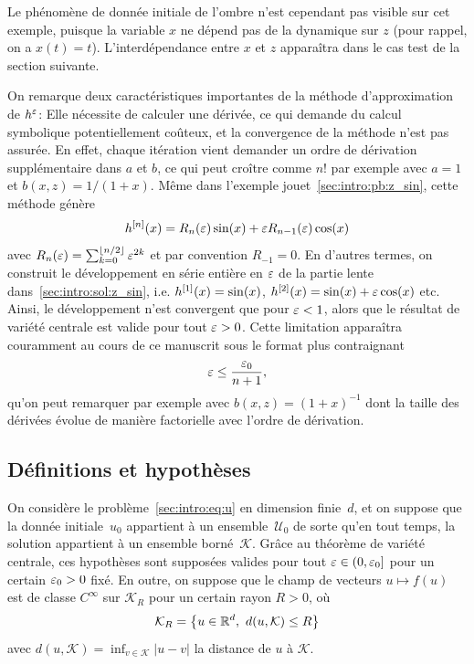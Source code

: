 \begin{FRremark*}
    Le phénomène de donnée initiale de l'ombre n'est cependant pas visible sur cet exemple, puisque la variable $x$ ne dépend pas de la dynamique sur $z$ (pour rappel, on a $x(t) = t$). L'interdépendance entre $x$ et $z$ apparaîtra dans le cas test de la section suivante.
\end{FRremark*}

On remarque deux caractéristiques importantes de la méthode d'approximation de $h^{\varepsilon}$: Elle nécessite de calculer une dérivée, ce qui demande du calcul symbolique potentiellement coûteux, et la convergence de la méthode n'est pas assurée. En effet, chaque itération vient demander un ordre de dérivation supplémentaire dans $a$ et $b$, ce qui peut croître comme $n!$ par exemple avec $a = 1$ et $b(x,z) = 1/(1+x)$. Même dans l'exemple jouet~\eqref{sec:intro:pb:z_sin}, cette méthode génère
\begin{equation*}
    h^{[n]}(x) = R_n(\varepsilon) \sin(x) + \varepsilon R_{n-1}(\varepsilon) \cos(x) 
\end{equation*}
avec $R_n(\varepsilon) = \sum_{k = 0}^{\left\lfloor n/2 \right\rfloor} \varepsilon^{2k}$ et par convention $R_{-1} = 0$. En d'autres termes, on construit le développement en série entière en $\varepsilon$ de la partie lente dans~\eqref{sec:intro:sol:z_sin}, i.e. $h^{[1]}(x) = \sin(x)$, $h^{[2]} (x) = \sin(x) + \varepsilon \cos(x)$ etc. Ainsi, le développement n'est convergent que pour $\varepsilon < 1$, alors que le résultat de variété centrale est valide pour tout $\varepsilon > 0$. 
%
Cette limitation apparaîtra couramment au cours de ce manuscrit sous le format plus contraignant
\begin{equation*}
    \varepsilon \leq \frac{\varepsilon_0}{n+1} ,
\end{equation*}
qu'on peut remarquer par exemple avec $b(x,z) = (1+x)^{-1}$ dont la taille des dérivées évolue de manière factorielle avec l'ordre de dérivation. 




\subsection*{Définitions et hypothèses}


On considère le problème~\eqref{sec:intro:eq:u} en dimension finie~$d$, et on suppose que la donnée initiale~$u_0$ appartient à un ensemble~$\mathcal{U}_0$ de sorte qu'en tout temps, la solution appartient à un ensemble borné~$\mathcal{K}$. Grâce au théorème de variété centrale, ces hypothèses sont supposées valides pour tout $\varepsilon \in (0, \varepsilon_0]$ pour un certain $\varepsilon_0 > 0$ fixé. En outre, on suppose que le champ de vecteurs $u \mapsto f(u)$ est de classe $C^\infty$ sur $\mathcal{K}_R$ pour un certain rayon $R > 0$, où
\begin{equation*}
    \mathcal{K}_R = \left\lbrace u \in \mathbb{R}^d,\ d(u, \mathcal{K}) \leq R \right\rbrace 
\end{equation*} 
avec $d(u, \mathcal{K}) = \inf_{v \in \mathcal{K}} |u-v|$ la distance de $u$ à $\mathcal{K}$. 